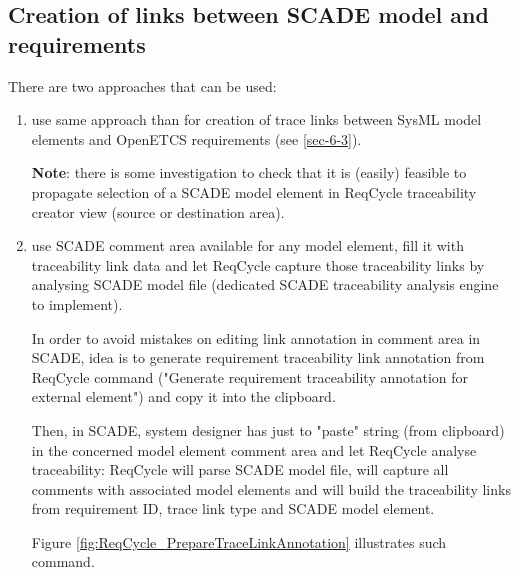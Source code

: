 \documentclass[11pt]{template/openetcs_report}
\begin{document}
\subsection{Creation of links between SCADE model and requirements}
\label{sec-6-4}
There are two approaches that can be used: 
\begin{enumerate}
\item use same approach than for creation of trace links between SysML model elements and OpenETCS requirements (see \ref{sec-6-3}).

\textbf{Note}: there is some investigation to check that it is (easily) feasible to propagate selection of a SCADE model element in ReqCycle traceability creator view (source or destination area).

\item use SCADE comment area available for any model element, fill it with traceability link data and let ReqCycle capture those traceability links by analysing SCADE model file (dedicated SCADE traceability analysis engine to implement). 

In order to avoid mistakes on editing link annotation in comment area in SCADE, idea is to generate requirement traceability link annotation from ReqCycle command ("Generate requirement traceability annotation for external element") and copy it into the clipboard. 

Then, in SCADE, system designer has just to "paste" string (from clipboard) in the concerned model element comment area and let ReqCycle analyse traceability: ReqCycle will parse SCADE model file, will capture all comments with associated model elements and will build the traceability links from requirement ID, trace link type and SCADE model element.


Figure \ref{fig:ReqCycle_PrepareTraceLinkAnnotation} illustrates such command.

\end{enumerate} 
\end{document}
